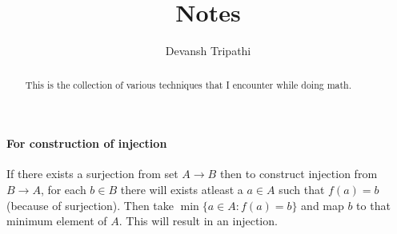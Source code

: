 \documentclass[12pt,reqno]{amsart}
\title{Notes}
\author{Devansh Tripathi}
\theoremstyle{plain}
\theoremstyle{definition}
\begin{document}
\begin{abstract}
    This is the collection of various techniques that I encounter while doing math.
\end{abstract}
\maketitle
\paragraph{\bf For construction of injection} If there exists a surjection from set $A \to B$ then to construct injection from $B \to A$, for each $b \in B$ there will exists atleast a $a \in A$ such that $f(a) = b$ (because of surjection). Then take $\min\{a \in A : f(a) = b\}$ and map $b$ to that minimum element of $A$. This will result in an injection.
\end{document}
